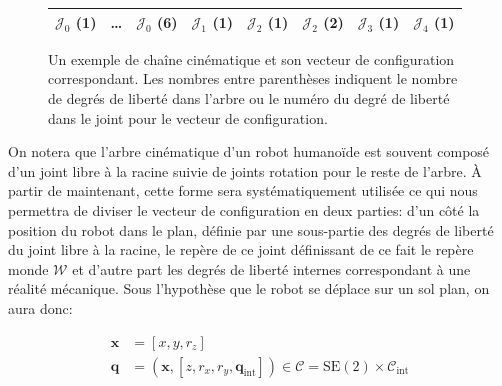 \begin{figure}[htbp!]
  \begin{center}

  \begin{tabular}{|ccc|c|cc|c|c|}
    \hline
    $\mathcal{J}_0$ (1) & \ldots & $\mathcal{J}_0$ (6)
    & $\mathcal{J}_1$ (1) & $\mathcal{J}_2$ (1) & $\mathcal{J}_2$ (2) & $\mathcal{J}_3$ (1) & $\mathcal{J}_4$ (1)\\
    \hline
  \end{tabular}
  \end{center}

  \caption{Un exemple de chaîne cinématique et son vecteur de
    configuration correspondant. Les nombres entre parenthèses
    indiquent le nombre de degrés de liberté dans l'arbre ou le numéro
    du degré de liberté dans le joint pour le vecteur de
    configuration.}
\end{figure}

On notera que l'arbre cinématique d'un robot humanoïde est souvent
composé d'un joint libre à la racine suivie de joints rotation pour le
reste de l'arbre. À partir de maintenant, cette forme sera
systématiquement utilisée ce qui nous permettra de diviser le vecteur
de configuration en deux parties: d'un côté la position du robot dans
le plan, définie par une sous-partie des degrés de liberté du joint
libre à la racine, le repère de ce joint définissant de ce fait le
repère monde $\mathcal{W}$ et d'autre part les degrés de liberté
internes correspondant à une réalité mécanique. Sous l'hypothèse que
le robot se déplace sur un sol plan, on aura donc:

\begin{equation} \label{eq:chap2_configuration}
  \begin{aligned}
    \mathbf{x} &= [x, y, r_z]\\
    \mathbf{q} &= (\mathbf{x}, [z, r_x, r_y, \mathbf{q}_{\text{int}}])
    \in \mathcal{C} = \text{SE}(2) \times \mathcal{C}_{\text{int}}
  \end{aligned}
\end{equation}

